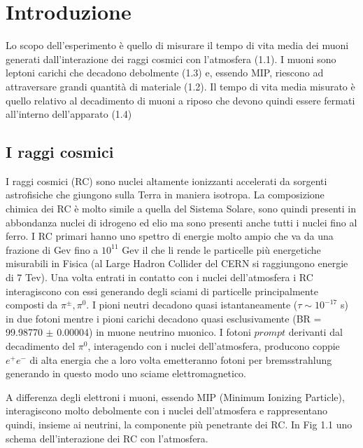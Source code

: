 \documentclass{standalone}
\begin{document}
	\pagestyle{fancy}
	\lhead{\rightmark}
	\rhead{\thepage}

\chapter{Introduzione}
Lo scopo dell'esperimento è quello di misurare il tempo di vita media dei muoni generati dall'interazione dei raggi cosmici con l'atmosfera (1.1). I muoni sono leptoni carichi che decadono debolmente (1.3) e, essendo MIP, riescono ad attraversare grandi quantità di materiale (1.2). Il tempo di vita media misurato è quello relativo al decadimento di muoni a riposo che devono quindi essere fermati all'interno dell'apparato (1.4)

\section{I raggi cosmici}
I raggi cosmici (RC) sono nuclei altamente ionizzanti accelerati da sorgenti astrofisiche che giungono sulla Terra in maniera isotropa. La composizione chimica dei RC è molto simile a quella del Sistema Solare, sono quindi presenti in abbondanza nuclei di idrogeno ed elio ma sono presenti anche tutti i nuclei fino al ferro.
I RC primari hanno uno spettro di energie molto ampio che va da una frazione di Gev fino a $10^{11}$ Gev il che li rende le particelle più energetiche misurabili in Fisica (al Large Hadron Collider del CERN si raggiungono energie di 7 Tev).
Una volta entrati in contatto con i nuclei dell'atmosfera i RC interagiscono con essi generando degli sciami di particelle principalmente composti da $\pi^\pm, \pi^0$.
I pioni neutri decadono quasi istantaneamente ($\tau \sim 10^{-17}$ s) in due fotoni mentre i pioni carichi decadono quasi esclusivamente (BR = 99.98770 $\pm$ 0.00004) in muone neutrino muonico.
I fotoni $prompt$ derivanti dal decadimento del $\pi^0$, interagendo con i nuclei dell'atmosfera, producono coppie $e^+e^-$ di alta energia che a loro volta emetteranno fotoni per bremsstrahlung generando in questo modo uno sciame elettromagnetico.

A differenza degli elettroni i muoni, essendo MIP (Minimum Ionizing Particle), interagiscono molto debolmente con i nuclei dell'atmosfera e rappresentano quindi, insieme ai neutrini, la componente più penetrante dei RC. In Fig 1.1 uno schema dell'interazione dei RC con l'atmosfera.
\end{document}
